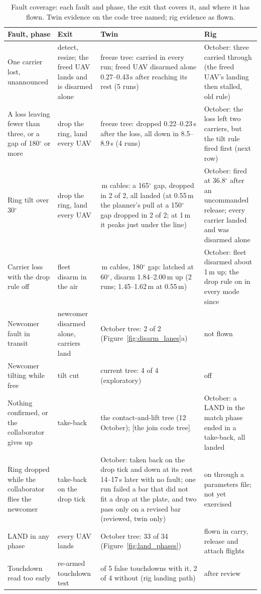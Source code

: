 \begin{table}[htbp]
\centering
\footnotesize
\caption[Fault coverage]{Fault coverage: each fault and phase, the exit that covers it, and where it has flown. Twin
evidence on the code tree named; rig evidence as flown.}
\label{tab:faults}
\begin{tabularx}{\textwidth}{>{\raggedright\arraybackslash}p{3.2cm}>{\raggedright\arraybackslash}p{2.6cm}>{\raggedright\arraybackslash}X>{\raggedright\arraybackslash}X}
\toprule
Fault, phase & Exit & Twin & Rig \\
\midrule
One carrier lost, unannounced & detect, resize; the freed UAV lands and is disarmed alone & freeze tree: carried in every run; freed UAV disarmed alone 0.27--0.43\,s after reaching its rest (5 runs) & 8 October: three carried through (the freed UAV's landing then stalled, old rule) \\
A loss leaving fewer than three, or a gap of 180$^\circ$ or more & drop the ring, land every UAV & freeze tree: dropped 0.22--0.23\,s after the loss, all down in 8.5--8.9\,s (4 runs) & 15 October: the loss left two carriers, but the tilt rule fired first (next row) \\
Ring tilt over 30$^\circ$ & drop the ring, land every UAV & 1\,m cables: a 165$^\circ$ gap, dropped in 2 of 2, all landed (at 0.55\,m the planner's pull at a 150$^\circ$ gap dropped in 2 of 2; at 1\,m it peaks just under the line) & 15 October: fired at 36.8$^\circ$ after an uncommanded release; every carrier landed and was disarmed alone \\
Carrier loss with the drop rule off & fleet disarm in the air & 1\,m cables, 180$^\circ$ gap: latched at 60$^\circ$, disarm 1.84--2.00\,m up (2 runs; 1.45--1.62\,m at 0.55\,m) & 14 October: fleet disarmed about 1\,m up; the drop rule on in every mode since \\
Newcomer fault in transit & newcomer disarmed alone, carriers land & 9 October tree: 2 of 2 (Figure~\ref{fig:disarm_lanes}a) & not flown \\
Newcomer tilting while free & tilt cut & current tree: 4 of 4 (exploratory) & off \\
Nothing confirmed, or the collaborator gives up & take-back & the contact-and-lift tree (12 October); [the join code tree] & 15 October: a LAND in the match phase ended in a take-back, all landed \\
Ring dropped while the collaborator flies the newcomer & take-back on the drop tick & 16 October: taken back on the drop tick and down at its rest 14--17\,s later with no fault; one run failed a bar that did not fit a drop at the plate, and two pass only on a revised bar (reviewed, twin only) & on through a parameters file; not yet exercised \\
LAND in any phase & every UAV lands & 9 October tree: 33 of 34 (Figure~\ref{fig:land_phases}) & flown in carry, release and attach flights \\
Touchdown read too early & re-armed touchdown test & 0 of 5 false touchdowns with it, 2 of 4 without (rig landing path) & after review \\
\bottomrule
\end{tabularx}
\end{table}

